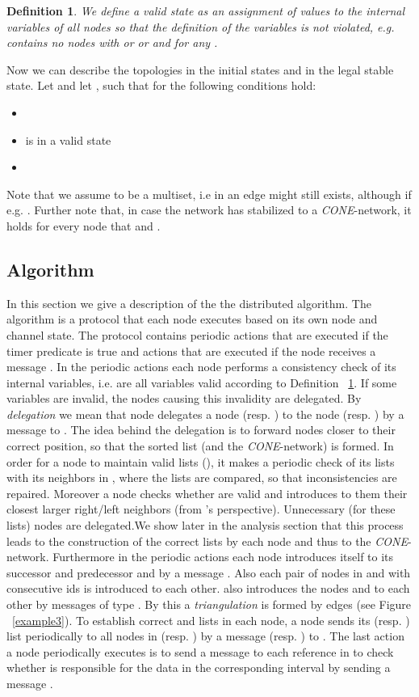 \documentclass[11pt]{article}
\newtheorem{definition}[theorem]{Definition}
\begin{document}
\begin{definition}\label{def:valid}
We define a valid state as an assignment of values to the internal variables of all nodes so that the definition of the variables is not violated, e.g.  contains no nodes  with  or  or  and  for any .
\end{definition}

Now we can describe the topologies in the initial states and in the legal stable state. Let  and let , such that for  the following conditions hold:

\begin{itemize}
  \item 
  \item  is in a valid state
  \item 
\end{itemize}

Note that we assume  to be a multiset, i.e in  an edge  might still exists, although  if e.g. .
Further note that, in case the network has stabilized to a \emph{CONE}-network, it holds for every node that  and .


\subsection{Algorithm}\label{app:alg}
In this section we give a description of the the distributed algorithm. The
algorithm is a protocol that each node executes based on its own node and
channel state. The protocol contains periodic actions that are executed if
the timer predicate  is true and actions that are executed if the node
receives a message .
In the periodic actions each node performs a consistency check of its
internal variables, i.e. are all variables valid according to Definition
~\ref{def:valid}. If some variables are invalid, the nodes causing this
invalidity are delegated. By \emph{delegation} we mean that node 
delegates a node  (resp. ) to the node  (resp. ) by a message
 to . The idea behind the delegation is to forward nodes closer to their correct position, so that the sorted list (and the \emph{CONE}-network) is formed.
In order for a node  to maintain valid lists (), it makes a periodic check of its lists with its neighbors in , where the lists are compared, so that inconsistencies
are repaired. Moreover a node checks whether  are valid and introduces to them their closest larger right/left neighbors (from 's perspective).
Unnecessary (for these lists) nodes are delegated.We show later in the analysis section that this process leads to the construction of the correct lists by each node and thus to the \emph{CONE}-network. 
Furthermore in the periodic actions each node introduces itself to its successor and predecessor  and  by a message . Also each pair of nodes in  and  with consecutive ids is introduced to each other.  also introduces the nodes  and  to each other by messages of type . By this a \emph{triangulation} is formed by edges
 (see Figure ~\ref{example3}).
To establish correct  and  lists in each node, a node  sends its
 (resp. ) list periodically to all nodes  in  (resp.
) by a message  (resp.
) to .
The last action a node periodically executes is to send a message to each
reference in  to check whether  is responsible for the data in the
corresponding interval  by sending a message
.
\end{document}
